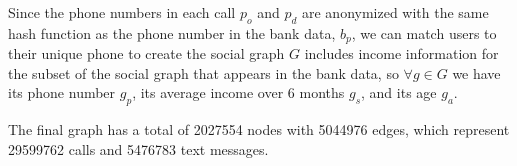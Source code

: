 Since the phone numbers in each call $p_o$ and $p_d$ are anonymized with the same hash function as the phone number in the bank data, $b_p$, we can match users to their unique phone to create the social graph $G$ includes income information for the subset of the social graph that appears in the bank data, so $\forall g \in G$ we have its phone number $g_p$,  its average income over 6 months $g_s$, and its age $g_a$.

The final graph has a total of \num{2027554} nodes with \num{5044976} edges, which represent \num{29599762} calls and \num{5476783} text messages.
